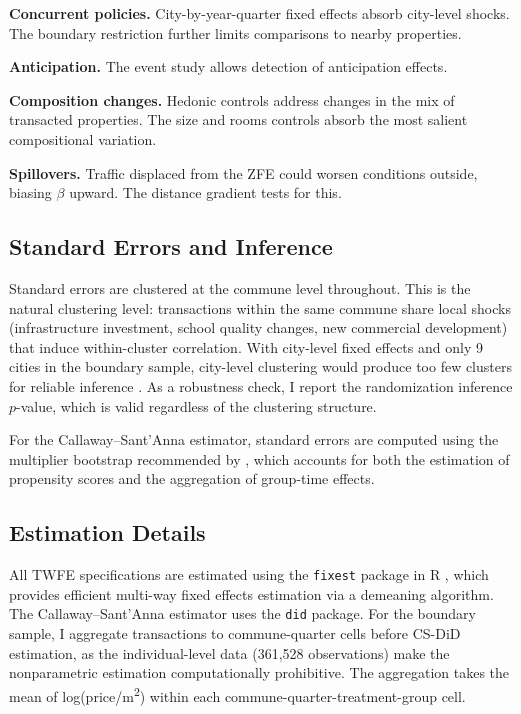 \documentclass[12pt]{article}
\begin{document}
\textbf{Concurrent policies.} City-by-year-quarter fixed effects absorb city-level shocks. The boundary restriction further limits comparisons to nearby properties.

\textbf{Anticipation.} The event study allows detection of anticipation effects.

\textbf{Composition changes.} Hedonic controls address changes in the mix of transacted properties. The size and rooms controls absorb the most salient compositional variation.

\textbf{Spillovers.} Traffic displaced from the ZFE could worsen conditions outside, biasing $\beta$ upward. The distance gradient tests for this.

\subsection{Standard Errors and Inference}

Standard errors are clustered at the commune level throughout. This is the natural clustering level: transactions within the same commune share local shocks (infrastructure investment, school quality changes, new commercial development) that induce within-cluster correlation. With city-level fixed effects and only 9 cities in the boundary sample, city-level clustering would produce too few clusters for reliable inference \citep{cameron2008bootstrap}. As a robustness check, I report the randomization inference $p$-value, which is valid regardless of the clustering structure.

For the Callaway--Sant'Anna estimator, standard errors are computed using the multiplier bootstrap recommended by \citet{callaway2021difference}, which accounts for both the estimation of propensity scores and the aggregation of group-time effects.

\subsection{Estimation Details}

All TWFE specifications are estimated using the \texttt{fixest} package in R \citep{berge2018efficient}, which provides efficient multi-way fixed effects estimation via a demeaning algorithm. The Callaway--Sant'Anna estimator uses the \texttt{did} package. For the boundary sample, I aggregate transactions to commune-quarter cells before CS-DiD estimation, as the individual-level data (361,528 observations) make the nonparametric estimation computationally prohibitive. The aggregation takes the mean of log(price/m\textsuperscript{2}) within each commune-quarter-treatment-group cell.
\end{document}

